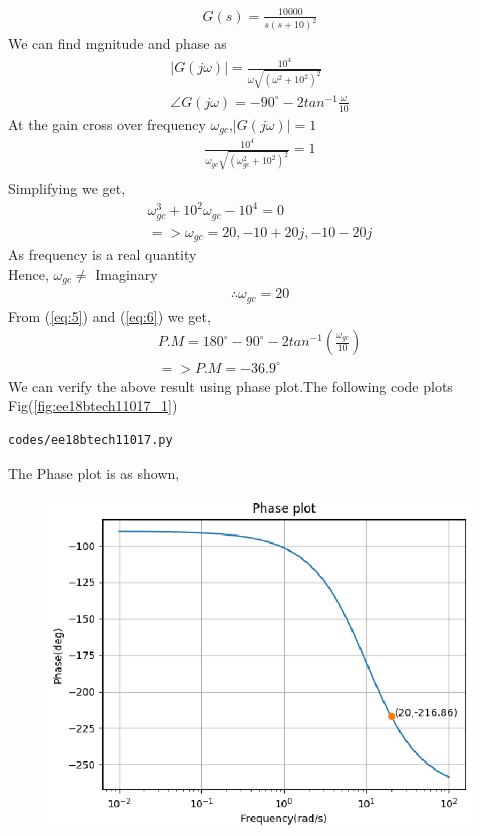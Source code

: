 \begin{enumerate}[label=\thesection.\arabic*.,ref=\thesection.\theenumi]
\begin{align}
G(s)=\frac{10000}{s(s+10)^{2}}
\label{eq:3} 
\end{align}
We can find mgnitude and phase as \\
\begin{align}
|G(j\omega)|=\frac{10^{4}}{\omega \sqrt{(\omega^{2}+10^{2})^{2}}} \\
\angle G(j\omega)=-90^{\circ}-2tan^{-1}\frac{\omega}{10} \label{eq:5} 
\end{align}
At the gain cross over frequency $\omega_{gc}$,$|G(j\omega)|=1$
\\
\begin{align}
\frac{10^{4}}{\omega_{gc} \sqrt{(\omega_{gc}^{2}+10^{2})^{2}}}=1 \\
\end{align}
Simplifying we get,
\begin{align}
\omega_{gc}^{3}+10^{2}\omega_{gc}-10^{4}=0 \\
=> \omega_{gc}=20,-10+20j,-10-20j
\end{align}
As frequency is a real quantity
\\Hence, $\omega_{gc} \neq$ Imaginary
\begin{align}
\therefore  \omega_{gc} =20   \label{eq:6} 
\end{align}
From (\ref{eq:5}) and (\ref{eq:6}) we get,
\begin{align}
P.M=180^{\circ}-90^{\circ}-2tan^{-1}(\frac{\omega_{gc}}{10}) \\
=> P.M=-36.9^{\circ}
\end{align}
We can verify the above result using phase plot.The following code plots Fig(\ref{fig:ee18btech11017_1})
\begin{lstlisting}
codes/ee18btech11017.py
\end{lstlisting}
The Phase plot is as shown,
\begin{figure}[!h]
  \includegraphics[width=\columnwidth]{./figures/ee18btech11017_1.eps}

\end{figure}
\end{enumerate}
